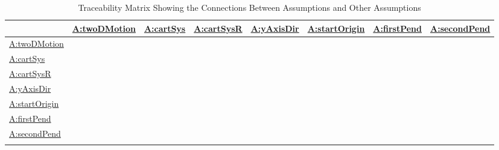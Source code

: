 \documentclass[12pt]{article}
\begin{document}
\begin{longtable}{l l l l l l l l}
\toprule
\textbf{} & \textbf{\hyperref[twoDMotion]{A:twoDMotion}} & \textbf{\hyperref[cartSys]{A:cartSys}} & \textbf{\hyperref[cartSysR]{A:cartSysR}} & \textbf{\hyperref[yAxisDir]{A:yAxisDir}} & \textbf{\hyperref[startOrigin]{A:startOrigin}} & \textbf{\hyperref[firstPend]{A:firstPend}} & \textbf{\hyperref[secondPend]{A:secondPend}}
\\
\midrule
\endhead
\hyperref[twoDMotion]{A:twoDMotion} &  &  &  &  &  &  & 
\\
\hyperref[cartSys]{A:cartSys} &  &  &  &  &  &  & 
\\
\hyperref[cartSysR]{A:cartSysR} &  &  &  &  &  &  & 
\\
\hyperref[yAxisDir]{A:yAxisDir} &  &  &  &  &  &  & 
\\
\hyperref[startOrigin]{A:startOrigin} &  &  &  &  &  &  & 
\\
\hyperref[firstPend]{A:firstPend} &  &  &  &  &  &  & 
\\
\hyperref[secondPend]{A:secondPend} &  &  &  &  &  &  & 
\\
\bottomrule
\caption{Traceability Matrix Showing the Connections Between Assumptions and Other Assumptions}
\label{Table:TraceMatAvsA}
\end{longtable}
\end{document}
